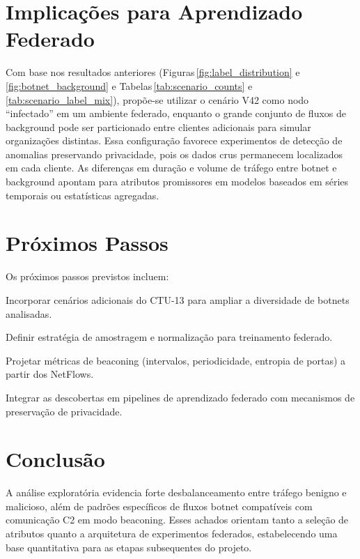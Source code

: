 \documentclass[a4paper, 12pt]{article}
\begin{document}


\section{Implicações para Aprendizado Federado}
Com base nos resultados anteriores (Figuras\,\ref{fig:label_distribution} e \ref{fig:botnet_background} e Tabelas\,\ref{tab:scenario_counts} e \ref{tab:scenario_label_mix}), propõe-se utilizar o cenário V42 como nodo ``infectado'' em um ambiente federado, enquanto o grande conjunto de fluxos de background pode ser particionado entre clientes adicionais para simular organizações distintas. Essa configuração favorece experimentos de detecção de anomalias preservando privacidade, pois os dados crus permanecem localizados em cada cliente. As diferenças em duração e volume de tráfego entre botnet e background apontam para atributos promissores em modelos baseados em séries temporais ou estatísticas agregadas.

\section{Próximos Passos}
Os próximos passos previstos incluem:
\begin{compactitem}
    \item Incorporar cenários adicionais do CTU-13 para ampliar a diversidade de botnets analisadas.
    \item Definir estratégia de amostragem e normalização para treinamento federado.
    \item Projetar métricas de beaconing (intervalos, periodicidade, entropia de portas) a partir dos NetFlows.
    \item Integrar as descobertas em pipelines de aprendizado federado com mecanismos de preservação de privacidade.
\end{compactitem}

\section{Conclusão}
A análise exploratória evidencia forte desbalanceamento entre tráfego benigno e malicioso, além de padrões específicos de fluxos botnet compatíveis com comunicação C2 em modo beaconing. Esses achados orientam tanto a seleção de atributos quanto a arquitetura de experimentos federados, estabelecendo uma base quantitativa para as etapas subsequentes do projeto.
\end{document}
